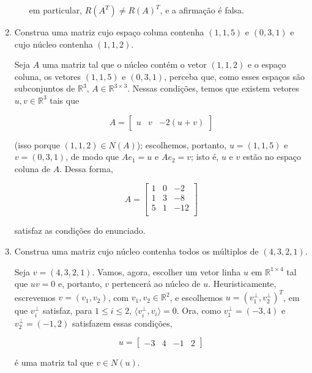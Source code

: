 \documentclass[leqno]{article}
\begin{document}
\begin{enumerate}
\begin{enumerate}
\begin{sol}
		\noindent em particular, $R(A^{T}) \neq R(A)^{T}$, e a afirmação é falsa.  
	    \end{sol} 
        \end{enumerate}

    \item Construa uma matriz cujo espaço coluna contenha $(1,1,5)$ e $(0,3,1)$ e cujo núcleo contenha $(1,1,2)$.

    \begin{sol} 
    	Seja $A$ uma matriz tal que o núcleo contém o vetor $(1, 1, 2)$ e o espaço coluna, os vetores $(1, 1, 5)$ e $(0, 3, 1)$, perceba que, como esses espaços são subconjuntos de $\mathbb{R}^{3}$, $A \in \mathbb{R}^{3 \times 3}$. Nessas condições, temos que existem vetores $u, v \in \mathbb{R}^{3}$ tais que 

	\begin{equation*} 
		A = 
		\begin{bmatrix} 
			u & v & -2(u + v)    
		\end{bmatrix} 
	\end{equation*} 

	\noindent (isso porque $(1, 1, 2) \in N(A)$); escolhemos, portanto, $u = (1, 1, 5)$ e $v = (0, 3, 1)$, de modo que $Ae_{1} = u$ e $Ae_{2} = v$; isto é, $u$ e $v$ estão no espaço coluna de $A$. Dessa forma, 

	\begin{equation*} 
		A = 
		\begin{bmatrix} 
			1 & 0 & -2 \\ 
			1 & 3 & -8 \\ 
			5 & 1 & -12 \\ 
		\end{bmatrix} 
	\end{equation*} 

	\noindent satisfaz as condições do enunciado.  
    \end{sol} 

    \item Construa uma matriz cujo núcleo contenha todos os múltiplos de $(4,3,2,1)$.
    
    \begin{sol} 
	    Seja $v = (4, 3, 2, 1)$. Vamos, agora, escolher um vetor linha $u$ em $\mathbb{R}^{1 \times 4}$ tal que $uv = 0$ e, portanto, $v$ pertencerá ao núcleo de $u$. Heuristicamente, escrevemos $v = (v_{1}, v_{2})$, com $v_{1}, v_{2} \in \mathbb{R}^{2}$, e escolhemos $u = (v_{1}^{\perp}, v_{2}^{\perp})^{T}$, em que $v_{i}^{\perp}$ satisfaz, para $1 \le i \le 2$, $\langle v_{i}^{\perp}, v_{i} \rangle = 0$. Ora, como $v_{1}^{\perp} = (-3, 4)$ e $v_{2}^{\perp} = (-1, 2)$ satisfazem essas condições, 

	    \begin{equation*} 
		    u = 
		    \begin{bmatrix} 
			    -3 & 4 & -1 & 2    
		    \end{bmatrix} 
	    \end{equation*} 

	    \noindent é uma matriz tal que $v \in N(u)$. 
    \end{sol} 
\end{enumerate} 

 
 
\end{document}

